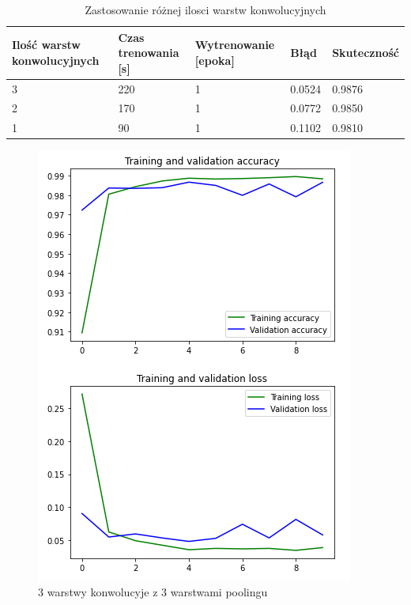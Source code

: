 \documentclass{article}
\begin{document}
\begin{table}[h]
  \centering
    
  \bgroup
  \def\arraystretch{1.3}
\begin{tabular}{|l|l|l|l|l|}
\hline
Ilość warstw konwolucyjnych & Czas trenowania [s] & Wytrenowanie [epoka] & Błąd & Skuteczność \\ \hline
3 & 220 & 1 & 0.0524 & 0.9876 \\ \hline
2 & 170 & 1 & 0.0772 & 0.9850 \\ \hline
1 & 90 & 1 & 0.1102 & 0.9810 \\ \hline
\end{tabular}
  \egroup
  \vspace{10pt}
  \caption{Zastosowanie różnej ilosci warstw konwolucyjnych}
\end{table}

\begin{figure}[h]
  \centering
  \includegraphics[width=\linewidth]{3_conv_3_max.png}
  \caption{3 warstwy konwolucyje z 3 warstwami poolingu}
\end{figure}
\end{document}
